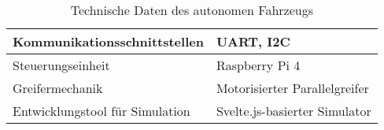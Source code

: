 \documentclass[main.tex]{subfiles} %
\begin{document}
\begin{table}[h!]
\begin{tabular}{|l|p{7cm}|}
        Kommunikationsschnittstellen       & UART, I2C                                                                 \\ \hline
        Steuerungseinheit                  & Raspberry Pi 4                                                            \\ \hline %
        Greifermechanik                    & Motorisierter Parallelgreifer                                             \\ \hline
        Entwicklungstool für Simulation    & Svelte.js-basierter Simulator                                             \\ \hline
    \end{tabular}
    \caption{Technische Daten des autonomen Fahrzeugs}
    \label{tab:hardfacts}
\end{table}
\end{document}
